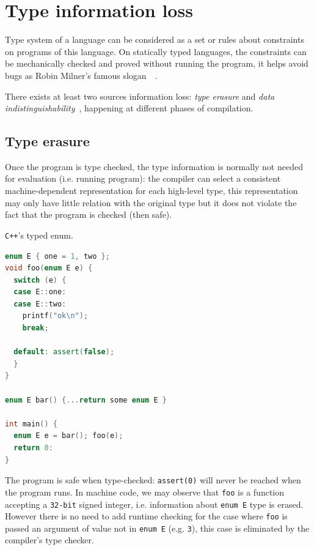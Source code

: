 \documentclass[a4paper]{llncs}
\begin{document}
\section{Type information loss}
Type system of a language can be considered as a set or rules about constraints
on programs of this language. On statically typed languages, the constraints
can be mechanically checked and proved without running the program, it helps
avoid bugs as Robin Milner's famous slogan~~\cite{milner_theory_1978}.

There exists at least two sources information loss: \emph{type erasure} and
\emph{data indistinguishability}~\cite{noauthor_struct_nodate}, happening at
different phases of compilation.

\subsection{Type erasure}
Once the program is type checked, the type information is normally not needed for
evaluation (i.e. running program): the compiler can select a consistent machine-dependent
representation for each high-level type, this representation may only have little
relation with the original type but it does not violate the fact that the program
is checked (then safe).

\begin{example}\label{exa:typed_enum}
\texttt{C++}'s typed enum.

\begin{lstlisting}[frame=lines, language={C++}]
enum E { one = 1, two };
void foo(enum E e) {
  switch (e) {
  case E::one:
  case E::two:
    printf("ok\n");
    break;

  default: assert(false);
  }
}

enum E bar() {...return some enum E }

int main() {
  enum E e = bar(); foo(e);
  return 0:
}
\end{lstlisting}

The program is safe when type-checked: \texttt{assert(0)} will
never be reached when the program runs. In machine code, we may observe that
\texttt{foo} is a function accepting a \texttt{32-bit} signed integer, i.e. information about
\texttt{enum E} type is erased. However there is no need to add runtime
checking for the case where \texttt{foo} is passed an argument of value not in \texttt{enum E}
(e.g. \texttt{3}), this case is eliminated by the compiler's type checker.
\end{example}
\end{document}

